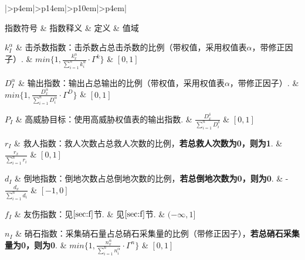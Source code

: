 \documentclass{ctexart}
\begin{document}
\begin{longtable}{|>{\centering\arraybackslash}p{4em}|>{\centering\arraybackslash}p{14em}|>{\centering\arraybackslash}p{10em}|>{\centering\arraybackslash}p{4em}|}

    \hline

    指数符号         & 指数释义                                                & 定义                                                                        & 值域             \endhead

    \hline

    $k_I^\alpha$ & 击杀数指数：击杀数占总击杀数的比例（带权值，采用权值表$\alpha$，带修正因子）.         & $min\{1, \frac{k_x^\alpha}{\sum_{i = 1}^{n} k_i^\alpha} \cdot \Gamma^k\}$ & $[0, 1]$                \\

    \hline

    $D_I^\alpha$ & 输出指数：输出占总输出的比例（带权值，采用权值表$\alpha$，带修正因子）.            & $min\{1, \frac{D_x^\alpha}{\sum_{i = 1}^{n} D_i^\alpha} \cdot \Gamma^D\}$ & $[0, 1]$                \\

    \hline

    $P_I$        & 高威胁目标：使用高威胁权值表的输出指数.                                & $\frac{D_x^\delta}{\sum_{i = 1}^{n} D_i^\delta}$                          & $[0, 1]$                \\

    \hline

    $r_I$        & 救人指数：救人次数占总救人次数的比例，\textbf{若总救人次数为0，则为1}.           & $\frac{r_x}{\sum_{i = 1}^{n} r_i}$                                        & $[0, 1]$                \\

    \hline

    $d_I$        & 倒地指数：倒地次数占总倒地次数的比例，\textbf{若总倒地次数为0，则为0}.           & -$\frac{d_x}{\sum_{i = 1}^{n} d_i}$                                       & $[-1, 0]$               \\

    \hline

    $f_I$        & 友伤指数：见$\ref{sec:f}$节.                               & 见$\ref{sec:f}$节.                                                          & $(-\infty, 1]$          \\

    \hline

    $n_I$        & 硝石指数：采集硝石量占总硝石采集量的比例（带修正因子），\textbf{若总硝石采集量为0，则为0}. & $min\{1, \frac{n_x^\alpha}{\sum_{i = 1}^{n} n_i^\alpha} \cdot \Gamma^n\}$ & $[0, 1]$                \\


\end{longtable}
\end{document}
